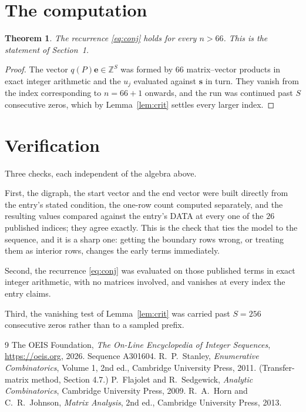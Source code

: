\documentclass[11pt,a4paper]{article}
\theoremstyle{plain}
\newtheorem{theorem}{Theorem}
\theoremstyle{definition}
\begin{document}
\section{The computation}

\begin{theorem}
The recurrence \eqref{eq:conj} holds for every $n>66$. This is the statement of
Section~1.
\end{theorem}

\begin{proof}
The vector $q(P)\mathbf{e}\in\mathbb{Z}^{S}$ was formed by $66$ matrix--vector
products in exact integer arithmetic and the $u_j$ evaluated against $\mathbf{s}$ in turn.
They vanish from the index corresponding to $n=66+1$ onwards, and the run was continued
past $S$ consecutive zeros, which by Lemma~\ref{lem:crit} settles every larger index.
\end{proof}

\section{Verification}

Three checks, each independent of the algebra above.

First, the digraph, the start vector and the end vector were built directly from the
entry's stated condition, the one-row count computed separately, and the resulting values
compared against the entry's DATA at every one of the $26$ published indices; they
agree exactly. This is the check that ties the model to the sequence, and it is a sharp one:
getting the boundary rows wrong, or treating them as interior rows, changes the early terms
immediately.

Second, the recurrence \eqref{eq:conj} was evaluated on those published terms in exact
integer arithmetic, with no matrices involved, and vanishes at every index the entry claims.

Third, the vanishing test of Lemma~\ref{lem:crit} was carried past $S=256$ consecutive
zeros rather than to a sampled prefix.

\begin{thebibliography}{9}
 The OEIS Foundation, \emph{The On-Line Encyclopedia of Integer
Sequences}, \url{https://oeis.org}, 2026. Sequence A301604.
 R.~P.~Stanley, \emph{Enumerative Combinatorics}, Volume 1, 2nd ed.,
Cambridge University Press, 2011. (Transfer-matrix method, Section 4.7.)
 P.~Flajolet and R.~Sedgewick, \emph{Analytic Combinatorics}, Cambridge
University Press, 2009.
 R.~A.~Horn and C.~R.~Johnson, \emph{Matrix Analysis}, 2nd ed., Cambridge
University Press, 2013.
\end{thebibliography}
\end{document}
